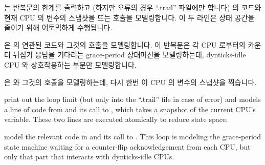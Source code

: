 \iffalse

The next step is to model the interface to RCU's grace-period
processing.
For this, we need to model
\co{dyntick_save_progress_counter()},
\co{rcu_try_flip_waitack_needed()},
\co{rcu_try_flip_waitmb_needed()},
as well as portions of
\co{rcu_try_flip_waitack()} and
\co{rcu_try_flip_waitmb()}, all from the 2.6.25-rc4 kernel.
The following \co{grace_period()} Promela process models
these functions as they would be invoked during a single pass
through preemptible RCU's grace-period processing.

\fi



\begin{fcvref}
 는 반복문의 한계를 출력하고 (하지만 오류의 경우
``.trail'' 파일에만 합니다)  의 코드와 현재 CPU 의
 변수의 스냅샷을 뜨는
 호출을 모델링합니다.
이 두 라인은 상태 공간을 줄이기 위해 어토믹하게 수행됩니다.

 은  의 연관된 코드와 그것의
 호출을 모델링합니다.
이 반복문은 각 CPU 로부터의 카운터 뒤집기 응답을 기다리는 grace-period
상태머신을 모델링하는데, dynticks-idle CPU 와 상호작용하는 부분만 모델링합니다.

 은  와 그것의
 호출을 모델링하는데, 다시 한번 이 CPU 의
 변수의 스냅샷을 찍습니다.

\iffalse

\begin{fcvref}
 print out the loop limit
(but only into the ``.trail'' file
in case of error) and models a line of code
from  and its call to
, which takes a
snapshot of the current CPU's 
variable.
These two lines are executed atomically to reduce state space.

 model the relevant code in
 and its call to
.
This loop is modeling the grace-period state machine waiting for
a counter-flip acknowledgement from each CPU, but only that part
that interacts with dynticks-idle CPUs.


\end{fcvref}
\end{fcvref}
